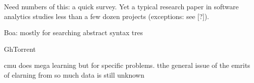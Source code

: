 
Need numbers of this: a quick survey. Yet  a  typical research paper in software analytics studies less than a few dozen projects (exceptions: see [?]).


Boa: mostly for searching abstract syntax tres 

GhTorrent

cmu does mega learning but for specific problems. tthe general issue of the emrits of elarning from so much data is still unknown


% 
%
%



